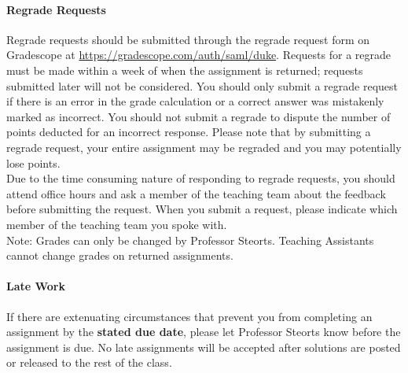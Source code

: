 \documentclass[11pt]{article}
\begin{document}
\paragraph{Regrade Requests}

Regrade requests should be submitted through the regrade request form on Gradescope at \url{https://gradescope.com/auth/saml/duke}. Requests for a regrade must be made within a week of when the assignment is returned; requests submitted later will not be considered. You should only submit a regrade request if there is an error in the grade calculation or a correct answer was mistakenly marked as incorrect. You should not submit a regrade to dispute the number of points deducted for an incorrect response. Please note that by submitting a regrade request, your entire assignment may be regraded and you may potentially lose points.\\

Due to the time consuming nature of responding to regrade requests, you should attend office hours and ask a member of the teaching team about the feedback before submitting the request. When you submit a request, please indicate which member of the teaching team you spoke with. \\

Note: Grades can only be changed by Professor Steorts. Teaching Assistants cannot change grades on returned assignments.\\


\paragraph{Late Work} 

If there are extenuating circumstances that prevent you from completing an assignment by the \textbf{stated due date}, please let Professor Steorts know before the assignment is due. No late assignments will be accepted after solutions are posted or released to the rest of the class. 
\end{document}
